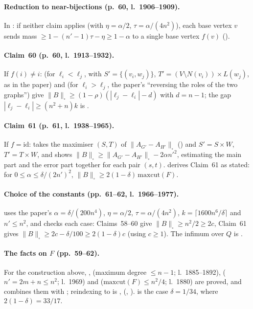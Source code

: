 \paragraph{Reduction to near-bijections (p.~60, l.~1906--1909).} In : if neither claim
applies (with $\eta=\alpha/2$, $\tau=\alpha/(4n^2)$), each base vertex $v$ sends mass
$\ge1-(n'-1)\tau-\eta\ge1-\alpha$ to a single base vertex $f(v)$ ().

\paragraph{Claim~60 (p.~60, l.~1913--1932).} If $f(i)\ne i$:  (for $\ell_i<\ell_j$, with
$S'=\{(v_i,w_j)\}$, $T'=(V\setminus N(v_i))\times L(w_j)$, as in the paper) and  (for
$\ell_i>\ell_j$, the paper's ``reversing the roles of the two graphs'') give
$\|B\|_\square\ge(1-\rho)(|\ell_j-\ell_i|-d)$ with $d=n-1$; the gap $|\ell_j-\ell_i|\ge(n^2+n)k$ is .

\paragraph{Claim~61 (p.~61, l.~1938--1965).} If $f=\mathrm{id}$:  takes the maximiser $(S,T)$ of
$\|A_{G'}-A_{H'}\|_\square$ () and $S'=S\times W$, $T'=T\times W$, and shows
$\|B\|_\square\ge\|A_{G'}-A_{H'}\|_\square-2\alpha n'^2$, estimating the main part and the error part together for
each pair $(s,t)$.  derives Claim~61 as stated: for $0\le\alpha\le\delta/(2n')^2$,
$\|B\|_\square\ge2(1-\delta)\,\mathrm{maxcut}(F)$.

\paragraph{Choice of the constants (pp.~61--62, l.~1966--1977).}  uses the paper's
$\alpha=\delta/(200n^4)$, $\eta=\alpha/2$, $\tau=\alpha/(4n^2)$, $k=\lceil1600n^6/\delta\rceil$ and $n'\le n^2$,
and checks each case: Claims~58--60 give $\|B\|_\square\ge n^2/2\ge2c$, Claim~61 gives
$\|B\|_\square\ge2c-\delta/100\ge2(1-\delta)c$ (using $c\ge1$). The infimum over $Q$ is .

\paragraph{The facts on $F$ (pp.~59--62).} For the construction above, ,
 (maximum degree $\le n-1$; l.~1885--1892), 
($n'=2m+n\le n^2$; l.~1969) and  ($\mathrm{maxcut}(F)\le n^2/4$; l.~1880) are proved,
and  combines them with ; reindexing to
 is ,  (, ).
 is the case $\delta=1/34$, where $2(1-\delta)=33/17$.

